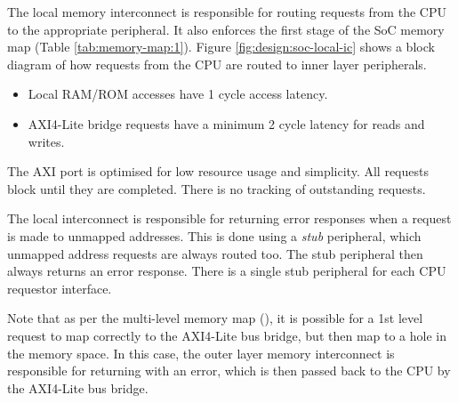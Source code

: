 
The local memory interconnect is responsible for routing requests from the
CPU to the appropriate peripheral.
It also enforces the first stage of the SoC memory map
(Table \ref{tab:memory-map:1}).
Figure \ref{fig:design:soc-local-ic} shows a block diagram of how
requests from the CPU are routed to inner layer peripherals.

\begin{itemize}[noitemsep]
\item Local RAM/ROM accesses have 1 cycle access latency.
\item AXI4-Lite bridge requests have a minimum 2 cycle latency for 
      reads and writes.
\end{itemize}

The AXI port is optimised for low resource usage and simplicity.
All requests block until they are completed. There is no
tracking of outstanding requests.

The local interconnect is responsible for returning error responses
when a request is made to unmapped addresses.
This is done using a {\em stub} peripheral, which unmapped address
requests are always routed too.
The stub peripheral then always returns an error response.
There is a single stub peripheral for each CPU requestor interface.

Note that as per the multi-level memory map (),
it is possible for a 1st level request to map correctly to the AXI4-Lite
bus bridge, but then map to a hole in the memory space.
In this case, the outer layer memory interconnect is responsible for
returning with an error, which is then passed back to the CPU by
the AXI4-Lite bus bridge.


